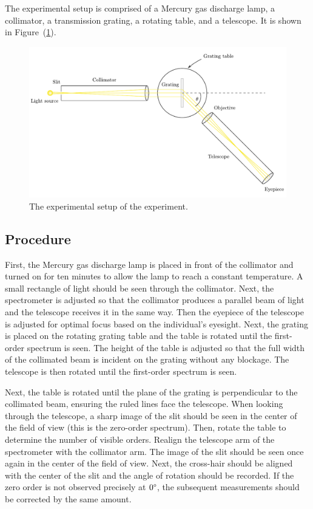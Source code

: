 \documentclass[10pt]{article}
\begin{document}
The experimental setup is comprised of a Mercury gas discharge lamp, a collimator, a transmission grating, a rotating table, and a telescope. It is shown in Figure~(\ref{fig:1}). 

\begin{figure}[hbt!]
  \centering
  \includegraphics[scale=0.6]{figures/f1.pdf}
  \caption{The experimental setup of the experiment.}
  \label{fig:1}
\end{figure}

\subsection*{Procedure}

First, the Mercury gas discharge lamp is placed in front of the collimator and turned on for ten minutes to allow the lamp to reach a constant temperature. A small rectangle of light should be seen through the collimator. Next, the spectrometer is adjusted so that the collimator produces a parallel beam of light and the telescope receives it in the same way. Then the eyepiece of the telescope is adjusted for optimal focus based on the individual's eyesight. Next, the grating is placed on the rotating grating table and the table is rotated until the first-order spectrum is seen. The height of the table is adjusted so that the full width of the collimated beam is incident on the grating without any blockage. The telescope is then rotated until the first-order spectrum is seen. 

Next, the table is rotated until the plane of the grating is perpendicular to the collimated beam, ensuring the ruled lines face the telescope. When looking through the telescope, a sharp image of the slit should be seen in the center of the field of view (this is the zero-order spectrum). Then, rotate the table to determine the number of visible orders. Realign the telescope arm of the spectrometer with the collimator arm. The image of the slit should be seen once again in the center of the field of view. Next, the cross-hair should be aligned with the center of the slit and the angle of rotation should be recorded. If the zero order is not observed precisely at $0\degree$, the subsequent measurements should be corrected by the same amount.
\end{document}
